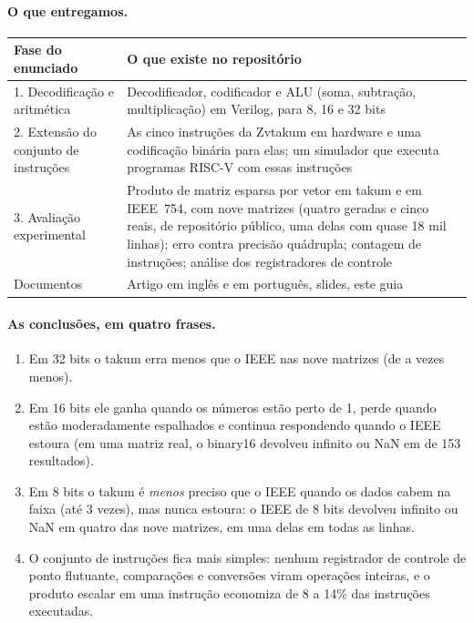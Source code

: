 \documentclass[11pt,a4paper]{article}
\begin{document}
\paragraph{O que entregamos.}
\begin{center}
\begin{tabularx}{\linewidth}{lX}
\toprule
Fase do enunciado & O que existe no repositório \\
\midrule
1. Decodificação e aritmética & Decodificador, codificador e ALU (soma, subtração, multiplicação) em
   Verilog, para 8, 16 e 32 bits \\
2. Extensão do conjunto de instruções & As cinco instruções da Zvtakum em hardware e uma codificação
   binária para elas; um simulador que executa programas RISC-V com essas instruções \\
3. Avaliação experimental & Produto de matriz esparsa por vetor em takum e em IEEE~754, com nove
   matrizes (quatro geradas e cinco reais, de repositório público, uma delas com quase 18 mil linhas); erro contra precisão quádrupla;
   contagem de instruções; análise dos registradores de controle \\
Documentos & Artigo em inglês e em português, slides, este guia \\
\bottomrule
\end{tabularx}
\end{center}

\paragraph{As conclusões, em quatro frases.}
\begin{enumerate}[nosep]
  \item Em 32 bits o takum erra menos que o IEEE nas nove matrizes (de \RATA{} a \RATB{} vezes menos).
  \item Em 16 bits ele ganha quando os números estão perto de 1, perde quando estão moderadamente
        espalhados e continua respondendo quando o IEEE estoura (em uma matriz real, o binary16 devolveu
        infinito ou NaN em \NFBCSH{} de 153 resultados).
  \item Em 8 bits o takum é \emph{menos} preciso que o IEEE quando os dados cabem na faixa (até 3 vezes),
        mas nunca estoura: o IEEE de 8 bits devolveu infinito ou NaN em quatro das nove matrizes, em uma
        delas em todas as linhas.
  \item O conjunto de instruções fica mais simples: nenhum registrador de controle de ponto flutuante,
        comparações e conversões viram operações inteiras, e o produto escalar em uma instrução economiza
        de 8 a 14\% das instruções executadas.
\end{enumerate}
\end{document}
